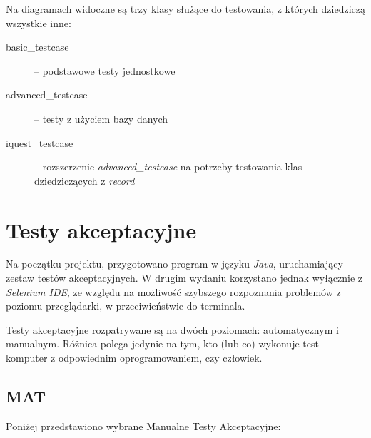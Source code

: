 Na diagramach widoczne są trzy klasy służące do testowania, z których dziedziczą wszystkie inne:
\begin{description}
\item[basic\_testcase] -- podstawowe testy jednostkowe
\item[advanced\_testcase] -- testy z użyciem bazy danych
\item[iquest\_testcase] -- rozszerzenie \textit{advanced\_testcase} na potrzeby testowania klas dziedziczących z \emph{record}
\end{description}

\section{Testy akceptacyjne}
\label{Chapter73}

Na początku projektu, przygotowano program w języku \textit{Java}, uruchamiający zestaw testów akceptacyjnych. W drugim wydaniu korzystano jednak wyłącznie z \textit{Selenium IDE}, ze względu na możliwość szybszego rozpoznania problemów z poziomu przeglądarki, w przeciwieństwie do terminala.

Testy akceptacyjne rozpatrywane są na dwóch poziomach: automatycznym i manualnym. Różnica polega jedynie na tym, kto (lub co) wykonuje test - komputer z odpowiednim oprogramowaniem, czy człowiek.

\subsection{MAT}
\label{Chapter731}
Poniżej przedstawiono wybrane Manualne Testy Akceptacyjne:

\matpres
{}
\matsteps
{}
\matremark{}

